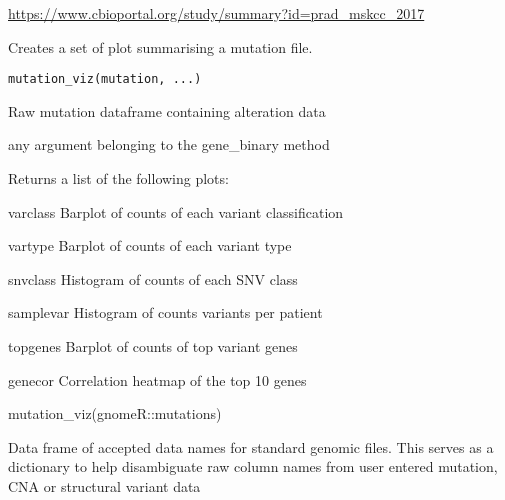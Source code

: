 \documentclass[a4paper]{book}
\begin{document}
%
\begin{Source}\relax
\url{https://www.cbioportal.org/study/summary?id=prad_mskcc_2017}
\end{Source}
%
\begin{Description}\relax
Creates a set of plot summarising a mutation file.
\end{Description}
%
\begin{Usage}
\begin{verbatim}
mutation_viz(mutation, ...)
\end{verbatim}
\end{Usage}
%
\begin{Arguments}
\begin{ldescription}
\item[\code{mutation}] Raw mutation dataframe containing alteration data

\item[\code{...}] any argument belonging to the gene\_binary method
\end{ldescription}
\end{Arguments}
%
\begin{Value}
Returns a list of the following plots:

varclass Barplot of counts of each variant classification

vartype Barplot of counts of each variant type

snvclass Histogram of counts of each SNV class

samplevar Histogram of counts variants per patient

topgenes Barplot of counts of top variant genes

genecor Correlation heatmap of the top 10 genes
\end{Value}
%
\begin{Examples}
\begin{ExampleCode}
mutation_viz(gnomeR::mutations)

\end{ExampleCode}
\end{Examples}
%
\begin{Description}\relax
Data frame of accepted data names for standard genomic files. This serves as a
dictionary to help disambiguate raw column names from user entered mutation,
CNA or structural variant data
\end{Description}
\end{document}
